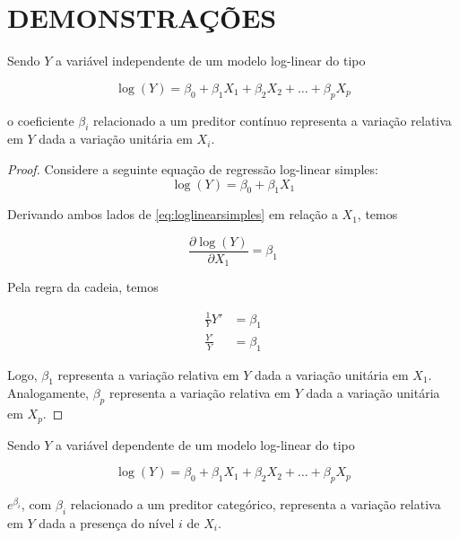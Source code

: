 

\chapter{DEMONSTRAÇÕES} \label{apendice_demonstracoes}

\begin{proposition}
  \label{proposicao1}

  Sendo $Y$ a variável independente de um modelo log-linear do tipo
  
  \begin{equation}
    \log(Y) = \beta_0 + \beta_1X_1 + \beta_2X_2 + \ldots + \beta_pX_p
  \end{equation} \label{eq:loglinear}
  
  \noindent o coeficiente $\beta_i$ relacionado a um preditor contínuo representa a variação relativa em $Y$ dada a variação unitária em $X_i$.

\end{proposition}

\begin{proof}
  Considere a seguinte equação de regressão log-linear simples:
  \begin{equation} \label{eq:loglinearsimples}
    \log(Y) = \beta_0 + \beta_1X_1
  \end{equation}

  Derivando ambos lados de \eqref{eq:loglinearsimples} em relação a $X_1$, temos

  \begin{equation} \label{eq:derivada1}
    \frac{\partial \log(Y)}{\partial X_1} = \beta_1
  \end{equation}

  Pela regra da cadeia, temos

  $$
  \begin{aligned}
    \frac{1}{Y}Y' &= \beta_1\\
    \frac{Y'}{Y} &= \beta_1
  \end{aligned}
  $$

  Logo, $\beta_1$ representa a variação relativa em $Y$ dada a variação unitária em $X_1$. Analogamente, $\beta_p$ representa a variação relativa em $Y$ dada a variação unitária em $X_p$.

\end{proof}

\begin{proposition}
  \label{proposicao2}

  Sendo $Y$ a variável dependente de um modelo log-linear do tipo
  
  \begin{equation}
    \log(Y) = \beta_0 + \beta_1X_1 + \beta_2X_2 + \ldots + \beta_pX_p
  \end{equation} \label{eq:loglinear2}
  
  \noindent $e^{\beta_i}$, com $\beta_i$ relacionado a um preditor categórico, representa a variação relativa em $Y$ dada a presença do nível $i$ de $X_i$.
\end{proposition}

